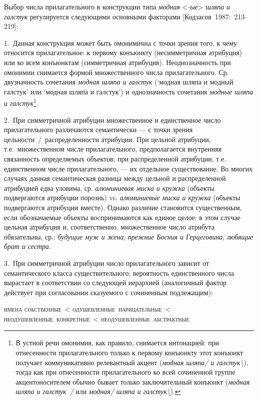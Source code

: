 Выбор числа прилагательного в конструкции типа \textit{модная}
\textless{}\textit{-ые}\textgreater{} \textit{шляпа и галстук} регулируется
следующими основными факторами {[}Кодзасов~1987:~213--219{]}:

1.~Данная конструкция может быть омонимична с точки зрения того, к чему
относится прилагательное: к первому конъюнкту (несимметричная атрибуция)
или ко всем конъюнктам (симметричная атрибуция). Неоднозначность при
омонимии снимается формой множественного числа прилагательного. Ср.
двузначность сочетания \textit{модная шляпа и галстук} (`модная шляпа и
модный галстук' или `модная шляпа и галстук') и однозначность сочетания
\textit{модные шляпа и галстук}\footnote{В устной речи омонимия, как
  правило, снимается интонацией: при отнесенности прилагательного только
  к первому конъюнкту этот конъюнкт получает коммуникативно релевантный
  акцент (\textit{модная шляпа/ и галстук\textbackslash{}}), тогда как при
  отнесенности прилагательного ко всей сочиненной группе
  акцентоносителем обычно бывает только заключительный конъюнкт
  (\textit{модная шляпа и галстук~/} или \textit{модная/ шляпа и
  галстук\textbackslash{}}).}.

2.~При симметричной атрибуции множественное и единственное число
прилагательного различаются семантически --- с точки зрения
цельности~/~распределенности атрибуции. При цельной атрибуции,
т.е.~множественном числе прилагательного, предполагается внутренняя
связанность определяемых объектов; при распределенной атрибуции, т.е.
единственном числе прилагательного, --- их отдельное существование. Во
многих случаях данная семантическая разница между цельной и
распределенной атрибуцией едва уловима, ср. \textit{алюминиевая миска и
кружка} (объекты подвергаются атрибуции порознь) vs. \textit{алюминиевые
миска и кружка} (объекты подвергаются атрибуции вместе). Однако различие
становится существенным, если обозначаемые объекты воспринимаются как
единое целое: в этом случае цельная атрибуция и, соответственно,
множественное число атрибута обязательны, ср.: \textit{будущие муж и
жена}, \textit{прежние Босния и Герцеговина}, \textit{любящие брат и
сестра}.

3.~При симметричной атрибуции число прилагательного зависит от
семантического класса существительного; вероятность единственного числа
вырастает в соответствии со следующей иерархией (аналогичный фактор
действует при согласовании сказуемого с сочиненным подлежащим):

\textsc{имена собственные~\textless{}
одушевленные~нарицательные~\textless{}
неодушевленные~конкретные~\textless{} неодушевленные~абстрактные}

